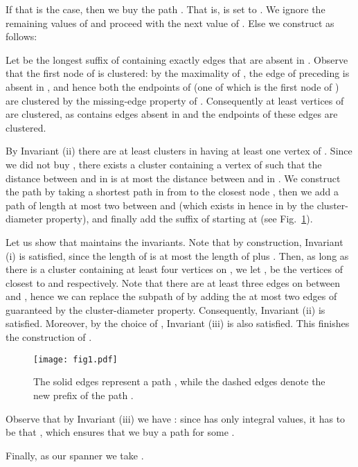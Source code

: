 \documentclass[a4paper,11pt]{article}
\theoremstyle{definition}
\begin{document}
If that is the case, then we buy the path . That is,  is set to .
We ignore the remaining values of  and proceed with the next value of .
Else we construct  as follows:


Let  be the longest suffix of  containing exactly  edges that are absent in .
Observe that the first node of  is clustered:
by the maximality of , the edge  of  preceding 
is absent in , and hence both the endpoints of  (one of which is the first node of ) are clustered by the missing-edge property of . 
Consequently at least  
vertices of  are clustered, as  contains  edges
absent in  and the endpoints of these edges are clustered. 

By Invariant (ii) there are at least  clusters in 
having at least one vertex of . Since we did not buy , there
exists a cluster  containing a vertex  of  such that the distance between  
and  in  is at most the distance between  and  in . We construct the path  by taking
a shortest path in  from  to the closest node , then we add a path of length at most two between  and  (which exists in  hence in  by the cluster-diameter property), and finally add the suffix of  starting at  (see Fig.~\ref{fig1}).




Let us show that  maintains the invariants. Note that by construction, Invariant (i) is satisfied, since the length of  is at most the length of  plus .
Then, as long as there is a cluster  containing at least four vertices on ,
we let ,  be the vertices of  closest to  and  respectively.
Note that there are at least three edges on  between  and , hence we
can replace the subpath of  by adding the at most two edges of 
guaranteed by the cluster-diameter property.
Consequently, Invariant (ii) is satisfied. Moreover, by the choice of , Invariant (iii) is also satisfied.
This finishes the construction of . 

\begin{figure}[t]
\begin{center}
\texttt{[image: fig1.pdf]}
\end{center}
\caption{The solid edges represent a path , while the dashed edges
  denote the new prefix of the path .}
\label{fig1}
\end{figure}

Observe that by Invariant (iii) we have : since 
 has only integral values, it has to be that ,
which ensures that we buy a path  for some .

Finally, as our spanner  we take .
\end{document}
